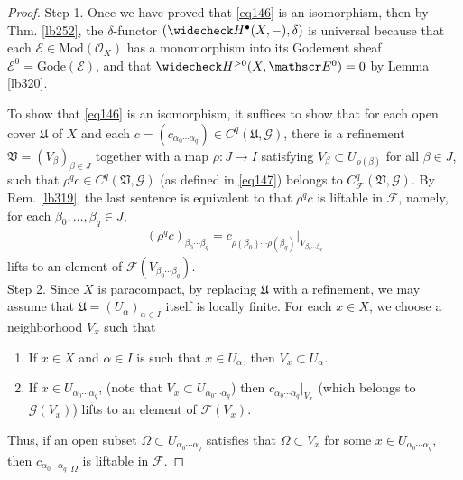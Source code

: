 \documentclass[12pt,b5paper,notitlepage]{report}
\theoremstyle{definition}
\theoremstyle{plain}
\newcommand{\fk}{\mathfrak}
\newcommand{\wch}{\widecheck}
\newcommand{\scr}{\mathscr}
\newcommand{\blt}{\bullet}
\newcommand{\Mod}{\mathrm{Mod}}
\newcommand{\Gode}{\mathrm{Gode}}
\numberwithin{equation}{section}
\begin{document}
\begin{proof}
Step 1. Once we have proved that \eqref{eq146} is an isomorphism, then by Thm. \ref{lb252}, the $\delta$-functor $(\wch H^\blt(X,-),\delta)$ is universal because that each $\scr E\in\Mod(\scr O_X)$ has a monomorphism into its Godement sheaf $\scr E^0=\Gode(\scr E)$, and that $\wch H^{>0}(X,\scr E^0)=0$ by Lemma \ref{lb320}.





To show that \eqref{eq146} is an isomorphism, it suffices to show that for each open cover $\fk U$ of $X$ and each $c=(c_{\alpha_0\cdots\alpha_q})\in C^q(\fk U,\scr G)$, there is a refinement $\fk V=(V_\beta)_{\beta\in J}$ together with a map $\rho:J\rightarrow I$ satisfying $V_\beta\subset U_{\rho(\beta)}$ for all $\beta\in J$, such that  $\rho^qc\in C^q(\fk V,\scr G)$ (as defined in \eqref{eq147}) belongs to $C^q_{\scr F}(\fk V,\scr G)$. By Rem. \ref{lb319}, the last sentence is equivalent to that $\rho^qc$ is liftable in $\scr F$, namely, for each $\beta_0,\dots,\beta_q\in J$, 
\begin{align*}
(\rho^qc)_{\beta_0\cdots\beta_q}=c_{\rho(\beta_0)\cdots\rho(\beta_q)}|_{V_{\beta_0\cdots\beta_q}}
\end{align*}
lifts to an element of $\scr F(V_{\beta_0\cdots\beta_q})$.\\


Step 2. Since $X$ is paracompact, by replacing $\fk U$ with a refinement, we may assume that $\fk U=(U_\alpha)_{\alpha\in I}$ itself is locally finite. For each $x\in X$, we choose a neighborhood $V_x$ such that
\begin{enumerate}[label=(\alph*)]
\item If $x\in X$ and $\alpha\in I$ is such that $x\in U_\alpha$, then $V_x\subset U_\alpha$.
\item If $x\in U_{\alpha_0\cdots\alpha_q}$, (note that $V_x\subset U_{\alpha_0\cdots\alpha_q}$) then $c_{\alpha_0\cdots\alpha_q}|_{V_x}$ (which belongs to $\scr G(V_x)$) lifts to an element of $\scr F(V_x)$.
\end{enumerate}
Thus, if an open subset $\Omega\subset U_{\alpha_0\cdots\alpha_q}$ satisfies that $\Omega\subset V_x$ for some $x\in U_{\alpha_0\cdots\alpha_q}$, then $c_{\alpha_0\cdots\alpha_q}|_\Omega$ is liftable in $\scr F$.


\end{proof}
\end{document}
